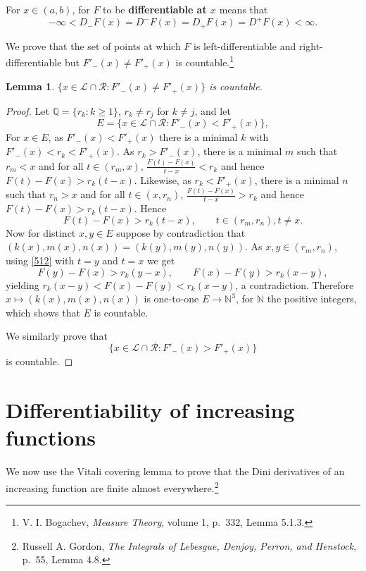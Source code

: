 \documentclass{article}
\newtheorem{lemma}[theorem]{Lemma}
\theoremstyle{definition}
\begin{document}
For $x \in (a,b)$, for $F$ to be \textbf{differentiable at $x$} means that
\[
-\infty<D_-F(x) = D^-F(x) = D_+F(x) = D^+F(x) <\infty.
\]


We prove that the set of points at which $F$ is  left-differentiable and right-differentiable
but $F'_-(x) \neq F'_+(x)$ is countable.\footnote{V. I. Bogachev, {\em Measure Theory}, volume 1, p.~332, Lemma 5.1.3.}

\begin{lemma}
$\{x \in \mathscr{L} \cap \mathscr{R}: F'_-(x) \neq F'_+(x)\}$ is countable.
\end{lemma}
\begin{proof}
Let $\mathbb{Q}=\{r_k: k \geq 1\}$, $r_k \neq r_j$ for $k \neq j$, and
let
\[
E=\{x \in \mathscr{L} \cap \mathscr{R}: F'_-(x)<F'_+(x)\},
\]
For $x \in E$, as $F'_-(x)<F'_+(x)$ there is a minimal $k$ with $F'_-(x)<r_k<F'_+(x)$. 
As $r_k > F'_-(x)$, there is a minimal $m$ such that $r_m<x$ and for all
$t \in (r_m,x)$, $\frac{F(t)-F(x)}{t-x}<r_k$
and hence $F(t)-F(x)>r_k(t-x)$. 
 Likewise,
as $r_k<F'_+(x)$, there is a minimal $n$ such that $r_n>x$ and for all
$t \in (x,r_n)$, $\frac{F(t)-F(x)}{t-x}>r_k$ and hence $F(t)-F(x)>r_k(t-x)$. 
Hence
\begin{equation}
F(t)-F(x)>r_k(t-x),\qquad  t \in (r_m,r_n), t \neq x.
\label{512} 
\end{equation}
Now for distinct $x,y \in E$ suppose by contradiction 
that $(k(x),m(x),n(x)) = (k(y),m(y),n(y))$. 
As $x,y \in (r_m,r_n)$, using \eqref{512} with $t=y$ and $t=x$ we get
\[
F(y)-F(x)>r_k(y-x),\qquad F(x)-F(y)>r_k(x-y),
\]
yielding $r_k(x-y)<F(x)-F(y)<r_k(x-y)$, a contradiction. 
Therefore $x \mapsto (k(x),m(x),n(x))$ is one-to-one
$E \to \mathbb{N}^3$, for $\mathbb{N}$ the positive integers, which shows
that $E$ is countable.


We similarly prove that
\[
\{x \in \mathscr{L} \cap \mathscr{R}: F'_-(x)>F'_+(x)\}
\]
is countable. 
\end{proof}




\section{Differentiability of increasing functions}
We now use the Vitali covering lemma to prove that the Dini derivatives of an increasing function are finite almost everywhere.\footnote{Russell A. Gordon, {\em The Integrals of Lebesgue, Denjoy, Perron, and Henstock}, p.~55, Lemma 4.8.}
\end{document}
